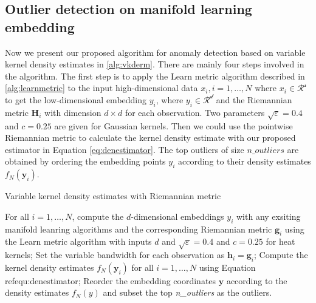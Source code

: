 \documentclass[11pt,a4paper,]{article}
\begin{document}
\hypertarget{outlier-detection-on-manifold-learning-embedding}{%
\subsection{Outlier detection on manifold learning embedding}\label{outlier-detection-on-manifold-learning-embedding}}

Now we present our proposed algorithm for anomaly detection based on variable kernel density estimates in \ref{alg:vkderm}. There are mainly four steps involved in the algorithm. The first step is to apply the Learn metric algorithm described in \ref{alg:learnmetric} to the input high-dimensional data \(x_i,i=1,\ldots,N\) where \(x_i\in \mathcal{R^s}\) to get the low-dimensional embedding \(y_i\), where \(y_i\in \mathcal{R^d}\) and the Riemannian metric \(\pmb{H}_i\) with dimension \(d\times d\) for each observation. Two parameters \(\sqrt{\varepsilon} = 0.4\) and \(c=0.25\) are given for Gaussian kernels. Then we could use the pointwise Riemannian metric to calculate the kernel density estimate with our proposed estimator in Equation \eqref{eq:denestimator}. The top outliers of size \(n\_outliers\) are obtained by ordering the embedding points \(y_i\) according to their density estimates \(f_N(\pmb{y}_i)\).

\begin{algorithm}[!htb]
  \caption{Variable kernel density estimates with Riemannian metric}
  \label{alg:vkderm}
  \DontPrintSemicolon
  \SetAlgoLined
  \BlankLine
  \begin{algorithmic}[1]

  \STATE For all $i=1,\ldots,N$, compute the $d$-dimensional embeddings $y_i$ with any exsiting manifold leanring algorithms and the corresponding Riemannian metric $\pmb{g}_i$ using the Learn metric algorithm with inputs $d$ and $\sqrt{\varepsilon} = 0.4$ and $c=0.25$ for heat kernels;
  \STATE Set the variable bandwidth for each observation as $\pmb{h}_i = \pmb{g}_i$;
  \STATE Compute the kernel density estimates $f_N(\pmb{y}_i)$ for all $i=1,\ldots,N$ using Equation \\ref{equ:denestimator};
  \STATE Reorder the embedding coordinates $\pmb{y}$ according to the density estimates $f_N(y)$ and subset the top \textit{n\_outliers} as the outliers.
  \end{algorithmic}
\end{algorithm}
\end{document}
